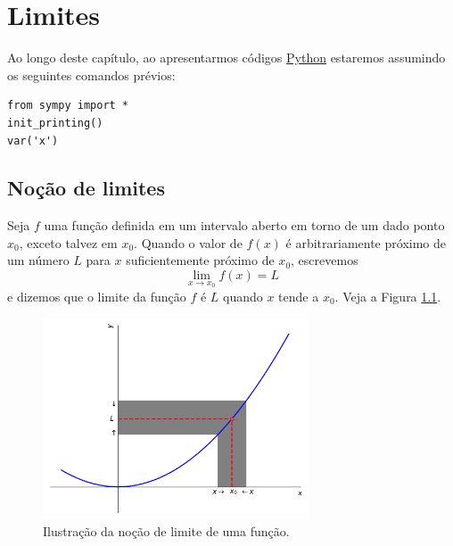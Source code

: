 
\chapter{Limites}\label{cap_lim}
\thispagestyle{fancy}

\ifispython
\begin{obs}\label{obs:cap_lim_python}
Ao longo deste capítulo, ao apresentarmos códigos \href{https://www.python.org/}{Python} estaremos assumindo os seguintes comandos prévios:
\begin{verbatim}
from sympy import *
init_printing()
var('x')
\end{verbatim}
\end{obs}
\fi

\section{Noção de limites}\label{cap_lim_sec_lim}

Seja $f$ uma função definida em um intervalo aberto em torno de um dado ponto $x_0$, exceto talvez em $x_0$. Quando o valor de $f(x)$ é arbitrariamente próximo de um número $L$ para $x$ suficientemente próximo de $x_0$, escrevemos
\begin{equation}
  \lim_{x\to x_0} f(x) = L
\end{equation}
e dizemos que o limite da função $f$ é $L$ quando $x$ tende a $x_0$. Veja a Figura \ref{fig:lim}.

\begin{figure}[H]
  \centering
  \includegraphics[width=0.7\textwidth]{./cap_lim/dados/fig_lim/fig_lim}
  \caption{Ilustração da noção de limite de uma função.}
  \label{fig:lim}
\end{figure}

